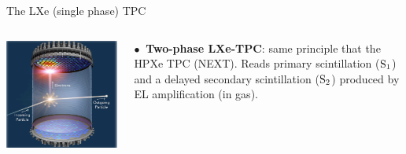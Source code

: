 \documentclass [aspectratio=169]{beamer}
\newcommand{\so}{\ensuremath{\rm S_1}}
\newcommand{\st}{\ensuremath{\rm S_2}}
\begin{document}
\begin{frame}{The LXe (single phase) TPC}
\begin{columns}
\includegraphics[scale=0.26]{dualLXe.png}

$\bullet~$ {\bf Two-phase LXe-TPC}: same principle that the HPXe TPC (NEXT). Reads primary scintillation (\so) and a delayed secondary scintillation (\st) produced by EL amplification (in gas). 


\end{columns}
\end{frame}
\end{document}
